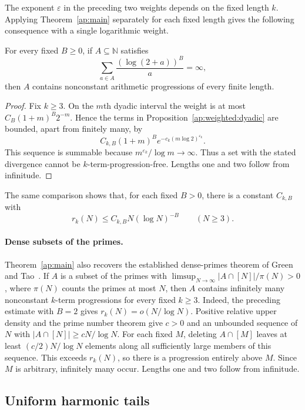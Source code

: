 The exponent $\varepsilon$ in the preceding two weights depends on the fixed
length $k$. Applying Theorem~\ref{ap:main} separately for each fixed
length gives the following consequence with a single logarithmic weight.

\begin{corollary}
\label{ap:weighted:logarithmic}
For every fixed $B\ge0$, if $A\subseteq\mathbb N$ satisfies
\[
            \sum_{a\in A}\frac{(\log(2+a))^B}{a}=\infty,
\]
then $A$ contains nonconstant arithmetic progressions of every finite
length.
\end{corollary}

\begin{proof}
Fix $k\ge3$. On the $m$th dyadic interval the weight is at most
$C_B(1+m)^B2^{-m}$. Hence the terms in
Proposition~\ref{ap:weighted:dyadic} are bounded, apart from finitely
many, by
\[
           C_{k,B}(1+m)^B e^{-c_k(m\log2)^{\varepsilon_k}}.
\]
This sequence is summable because $m^{\varepsilon_k}/\log m\to\infty$.
Thus a set with the stated divergence cannot be $k$-term-progression-free.
Lengths one and two follow from infinitude.
\end{proof}

The same comparison shows that, for each fixed $B>0$, there is a
constant $C_{k,B}$ with
\[
               r_k(N)\le C_{k,B}N(\log N)^{-B}\qquad(N\ge3).
\]

\paragraph{Dense subsets of the primes.}
Theorem~\ref{ap:main} also recovers the established dense-primes theorem
of Green and Tao~\cite[Theorem~1.2]{GreenTaoPrimes2008}.
If $A$ is a subset of the primes with
$\limsup_{N\to\infty}|A\cap[N]|/\pi(N)>0$, where $\pi(N)$ counts
the primes at most $N$, then $A$ contains infinitely many nonconstant
$k$-term progressions for every fixed $k\ge3$.
Indeed, the preceding estimate with $B=2$ gives
$r_k(N)=o(N/\log N)$. Positive relative upper density and the prime
number theorem give $c>0$ and an unbounded sequence of $N$ with
$|A\cap[N]|\ge cN/\log N$. For each fixed $M$, deleting $A\cap[M]$
leaves at least $(c/2)N/\log N$ elements along all sufficiently large
members of this sequence. This exceeds $r_k(N)$, so there is a
progression entirely above $M$. Since $M$ is arbitrary, infinitely
many occur. Lengths one and two follow from infinitude.

\subsection{Uniform harmonic tails}

